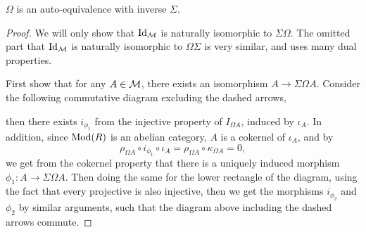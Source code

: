 \begin{theorem}
    \( \Omega \) is an auto-equivalence with inverse \( \Sigma \).
\end{theorem}
\begin{proof}
    We will only show that \( \operatorname{Id}_{{\mathcal{M}}} \) is naturally isomorphic to \( \Sigma \Omega \). The omitted part that \( \operatorname{Id}_{{\mathcal{M}}} \) is naturally isomorphic to \( \Omega \Sigma \) is very similar, and uses many dual properties.

    First show that for any \( A \in {\mathcal{M}} \), there exists an isomorphism \( A \to \Sigma \Omega A \). Consider the following commutative diagram excluding the dashed arrows,
    \begin{center}
    \end{center}
    then there exists \( i_{\phi_1} \) from the injective property of \( I_{\Omega A} \), induced by \( \iota_A \). In addition, since \( \operatorname{Mod}(R) \) is an abelian category, \( A \) is a cokernel of \( \iota_A \), and by
    \[
        \rho_{\Omega A} \circ i_{\phi_1} \circ \iota_A = \rho_{\Omega A} \circ \kappa_{\Omega A} = 0,
    \]
    we get from the cokernel property that there is a uniquely induced morphism \( \phi_1: A \to \Sigma\Omega A \). Then doing the same for the lower rectangle of the diagram, using the fact that every projective is also injective, then we get the morphisms \( i_{\phi_2} \) and \( \phi_2 \) by similar arguments, such that the diagram above including the dashed arrows commute.


\end{proof}
